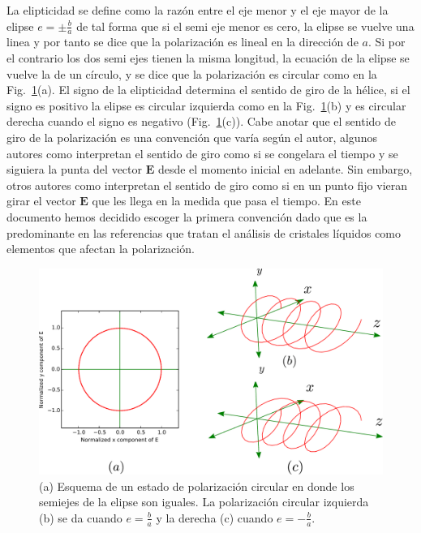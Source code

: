 La elipticidad se define como la razón entre el eje menor y el eje
mayor de la elipse $e=\pm\frac{b}{a}$ de tal forma que si el semi eje
menor es cero, la elipse se vuelve una linea y por tanto se dice que
la polarización es lineal en la dirección de $a$. Si por el contrario
los dos semi ejes tienen  la misma longitud, la ecuación de la elipse
se vuelve la de un círculo, y se dice que la polarización es
circular como en la Fig.~\ref{fig:circular_polarizations}(a). 
El signo de la elipticidad determina el sentido 
de giro de la hélice, si el signo es positivo la elipse es circular
izquierda como en la Fig.~\ref{fig:circular_polarizations}(b) y es
circular derecha 
cuando el signo es negativo (Fig.~\ref{fig:circular_polarizations}(c)). Cabe
anotar que el sentido de giro de la polarización es una convención
que varía según el autor, algunos autores como  interpretan el sentido de giro como
si se congelara el tiempo y se siguiera la punta del vector
$\mathbf{E}$ desde el momento inicial en adelante. Sin embargo, otros
autores como 
interpretan el sentido de giro como si en un punto fijo vieran girar
el vector $\mathbf{E}$ que les llega en la medida que pasa el tiempo. 
En este documento hemos decidido escoger la primera convención dado
que es la predominante en las referencias que tratan el análisis de
cristales líquidos como elementos que afectan la polarización. 
\begin{figure}[h!]
\centering
\includegraphics[scale=.5]{circular_polarizations}
\caption[Estados de polarización circular]{(a) Esquema de un estado de polarización circular en donde los semiejes
  de la elipse son iguales. La polarización circular izquierda (b) se da
cuando $e=\frac{b}{a}$ y la derecha (c) cuando  $e=-\frac{b}{a}$.}
\label{fig:circular_polarizations}
\end{figure}

